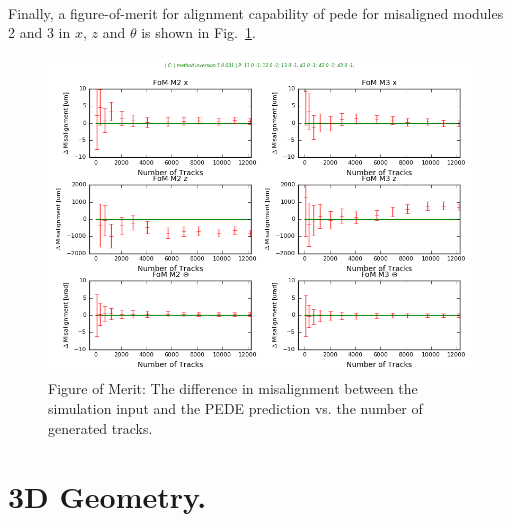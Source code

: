 \documentclass[a4paper,11pt]{article}
\begin{document}
\vspace{-0.2cm}\\
Finally, a figure-of-merit for alignment capability of pede for misaligned modules 2 and 3 in $x$, $z$ and $\theta$ is shown in Fig.~\ref{fig:PEDEFOM}.
\vspace{-0.2cm}
\begin{figure}[!ht]
\centering
\includegraphics[scale = 0.45]{fig/pedefom.png}  
    \vspace{-0.1cm}
    \caption{Figure of Merit: The difference in misalignment between the simulation input and the PEDE prediction vs. the number of generated tracks.}
\label{fig:PEDEFOM} 
\end{figure}
\vspace{-0.2cm}

\clearpage

\section{3D Geometry.}\label{sec:3D}
\end{document}

